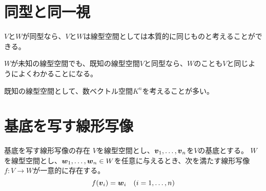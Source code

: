 \documentclass[../../../topic_linear-algebra]{subfiles}
\begin{document}
\sectionline
\section{同型と同一視}

$V$と$W$が同型なら、$V$と$W$は線型空間としては本質的に同じものと考えることができる。

$W$が未知の線型空間でも、既知の線型空間$V$と同型なら、$W$のことも$V$と同じようによくわかることになる。

\br

既知の線型空間として、数ベクトル空間$K^n$を考えることが多い。

\sectionline
\section{基底を写す線形写像}

\begin{theorem}{基底を写す線形写像の存在}
  $V$を線型空間とし、$\vb*{v}_1, \ldots, \vb*{v}_n$を$V$の基底とする。
  $W$を線型空間とし、$\vb*{w}_1, \ldots, \vb*{w}_n \in W$を任意に与えるとき、次を満たす線形写像$f\colon V \to W$が一意的に存在する。
  \begin{equation*}
    f(\vb*{v}_i) = \vb*{w}_i \quad (i = 1, \ldots, n)
  \end{equation*}
\end{theorem}
\end{document}
